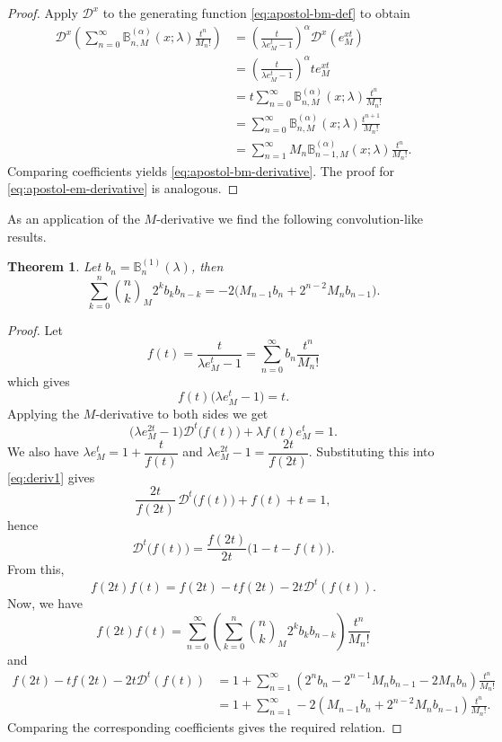 \documentclass[12pt, a4paper]{article}
\newtheorem{theorem}{Theorem}[section]
\theoremstyle{definition}
\numberwithin{equation}{section}
\newcommand{\B}{\mathbb{B}}
\begin{document}
\begin{proof}
Apply $\mathcal{D}^x$ to the generating function \eqref{eq:apostol-bm-def} to obtain
\begin{align*}
\mathcal{D}^x\left(\sum_{n=0}^\infty \B_{n,M}^{(\alpha)}(x;\lambda)\frac{t^n}{M_n!}\right) &= \left(\frac{t}{\lambda e_M^t-1}\right)^\alpha \mathcal{D}^x\left(e_M^{xt}\right) \\
&= \left(\frac{t}{\lambda e_M^t-1}\right)^\alpha t e_M^{xt} \\
&= t\sum_{n=0}^\infty \B_{n,M}^{(\alpha)}(x;\lambda)\frac{t^n}{M_n!} \\
&= \sum_{n=0}^\infty \B_{n,M}^{(\alpha)}(x;\lambda)\frac{t^{n+1}}{M_n!} \\
&= \sum_{n=1}^\infty M_n \B_{n-1,M}^{(\alpha)}(x;\lambda)\frac{t^n}{M_n!}.
\end{align*}
Comparing coefficients yields \eqref{eq:apostol-bm-derivative}. The proof for \eqref{eq:apostol-em-derivative} is analogous.
\end{proof}

As an application of the $M$-derivative we find the following convolution-like results.
\begin{theorem}
Let $b_n = \B_n^{(1)}(\lambda)$, then
\[
\sum_{k=0}^{n}\binom{n}{k}_M 2^k b_k b_{n-k}  = -2\bigl(M_{n-1}b_n+2^{n-2}M_nb_{n-1}\bigr).
\]
\end{theorem}
\begin{proof}
Let
\[
f(t)=\frac{t}{\lambda e_M^t-1}=\sum_{n=0}^\infty b_n\frac{t^n}{M_n!}
\]
which gives
\[
f(t)\bigl(\lambda e_M^t-1\bigr)=t .
\]
Applying the $M$-derivative to both sides we get
\begin{equation}\label{eq:deriv1}
\bigl(\lambda e_M^{2t}-1\bigr)\mathcal D^t\bigl(f(t)\bigr)+\lambda f(t)e_M^t=1.
\end{equation}
We also have $\lambda e_M^t = 1+\dfrac{t}{f(t)}$ and 
$\lambda e_M^{2t}-1 = \dfrac{2t}{f(2t)}.$ Substituting this into \eqref{eq:deriv1} gives
\[
\frac{2t}{f(2t)}\,\mathcal D^t\bigl(f(t)\bigr)+f(t)+t=1,
\]
hence
\begin{equation}\label{eq:deriv2}
\mathcal D^t\bigl(f(t)\bigr)=\frac{f(2t)}{2t}\bigl(1-t-f(t)\bigr).
\end{equation}
From this,
\[
f(2t)f(t) = f(2t)-tf(2t)-2t\mathcal{D}^t(f(t)).
\]
Now, we have 
\[
f(2t)f(t) = \sum_{n=0}^{\infty}\left(\sum_{k=0}^{n}\binom{n}{k}_M 2^k b_k b_{n-k}\right)\frac{t^n}{M_n!}
\]
and
\begin{align*}
f(2t)-tf(2t)-2t\mathcal{D}^t(f(t)) &= 1+\sum_{n=1}^{\infty}\left(2^nb_n-2^{n-1}M_{n}b_{n-1}-2M_nb_n\right)\frac{t^n}{M_n!}\\
&= 1 + \sum_{n=1}^{\infty}-2\left(M_{n-1}b_n+2^{n-2}M_nb_{n-1}\right)\frac{t^n}{M_n!}.
\end{align*}
Comparing the corresponding coefficients gives the required relation.
\end{proof}
\end{document}
